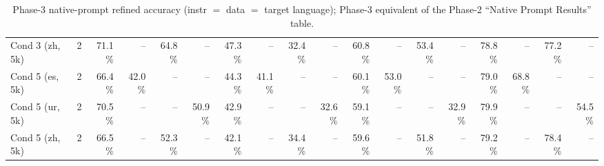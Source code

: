 \begin{table}[t]
\begin{tabular}{lrrrrrrrrrrrrrrrrr}
    Cond 3 (zh, 5k) & 2 & 71.1\% & -- & 64.8\% & -- & 47.3\% & -- & 32.4\% & -- & 60.8\% & -- & 53.4\% & -- & 78.8\% & -- & 77.2\% & -- \\
    Cond 5 (es, 5k) & 2 & 66.4\% & 42.0\% & -- & -- & 44.3\% & 41.1\% & -- & -- & 60.1\% & 53.0\% & -- & -- & 79.0\% & 68.8\% & -- & -- \\
    Cond 5 (ur, 5k) & 2 & 70.5\% & -- & -- & 50.9\% & 42.9\% & -- & -- & 32.6\% & 59.1\% & -- & -- & 32.9\% & 79.9\% & -- & -- & 54.5\% \\
    Cond 5 (zh, 5k) & 2 & 66.5\% & -- & 52.3\% & -- & 42.1\% & -- & 34.4\% & -- & 59.6\% & -- & 51.8\% & -- & 79.2\% & -- & 78.4\% & -- \\
    \bottomrule
  \end{tabular}
  \caption{Phase-3 native-prompt refined accuracy (instr $=$ data $=$ target language); Phase-3 equivalent of the Phase-2 ``Native Prompt Results'' table.}
  \label{tab:t2-native}
\end{table}

